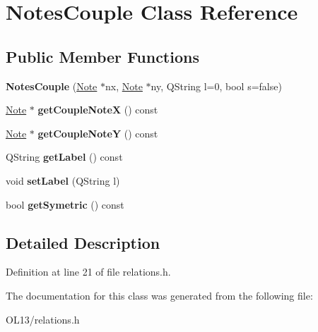 \hypertarget{class_notes_couple}{}\section{Notes\+Couple Class Reference}
\label{class_notes_couple}
\subsection*{Public Member Functions}
\begin{DoxyCompactItemize}
\item 
\mbox{\label{class_notes_couple_ac9bb6dd9ba7376af7030f3b64a24ae88}} 
{\bfseries Notes\+Couple} (\hyperlink{class_note}{Note} $\ast$nx, \hyperlink{class_note}{Note} $\ast$ny, Q\+String l=0, bool s=false)
\item 
\mbox{\label{class_notes_couple_a1769af8ac96f94717f9b59011ee3cab1}} 
\hyperlink{class_note}{Note} $\ast$ {\bfseries get\+Couple\+NoteX} () const
\item 
\mbox{\label{class_notes_couple_ab56dc53d43664f370a8d2af58c9d4b90}} 
\hyperlink{class_note}{Note} $\ast$ {\bfseries get\+Couple\+NoteY} () const
\item 
\mbox{\label{class_notes_couple_ac163d6cd5d3f17f7b74ec353e8feffb9}} 
Q\+String {\bfseries get\+Label} () const
\item 
\mbox{\label{class_notes_couple_a12fd471a0510e598869592460377258f}} 
void {\bfseries set\+Label} (Q\+String l)
\item 
\mbox{\label{class_notes_couple_addb870bdbfdd5586f214c908122e597d}} 
bool {\bfseries get\+Symetric} () const
\end{DoxyCompactItemize}


\subsection{Detailed Description}


Definition at line 21 of file relations.\+h.



The documentation for this class was generated from the following file\+:\begin{DoxyCompactItemize}
\item 
O\+L13/relations.\+h\end{DoxyCompactItemize}

